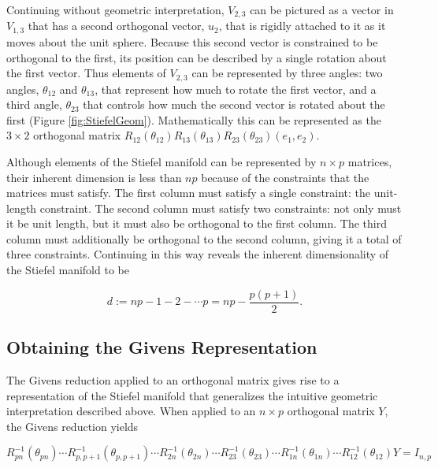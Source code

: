 \documentclass[ba]{imsart}
\numberwithin{equation}{section}
\theoremstyle{plain}
\begin{document}
\noindent Continuing without geometric interpretation, $V_{2,3}$ can be pictured as a vector in $V_{1,3}$ that has a second orthogonal vector, $u_2$, that is rigidly attached to it as it moves about the unit sphere. Because this second vector is constrained to be orthogonal to the first, its position can be described by a single rotation about the first vector. Thus elements of $V_{2,3}$ can be represented by three angles: two angles, $\theta_{12}$ and $\theta_{13}$, that represent how much to rotate the first vector, and a third angle, $\theta_{23}$ that controls how much the second vector is rotated about the first (Figure \ref{fig:StiefelGeom}). Mathematically this can be represented as the $3 \times 2$ orthogonal matrix $R_{12}(\theta_{12}) R_{13}(\theta_{13}) R_{23}(\theta_{23}) (e_1, e_2)$.

\noindent Although elements of the Stiefel manifold can be represented by $n \times p$ matrices, their inherent dimension is less than $np$ because of the constraints that the matrices must satisfy. The first column must satisfy a single constraint: the unit-length constraint. The second column must satisfy two constraints: not only must it be unit length, but it must also be orthogonal to the first column. The third column must additionally be orthogonal to the second column, giving it a total of three constraints. Continuing in this way reveals the inherent dimensionality of the Stiefel manifold to be

\begin{equation}
\label{eq:stiefel_dimension}
d := np - 1 - 2- \cdots p  = np - \frac{p(p+1)}{2}.
\end{equation}

\subsection{Obtaining the Givens Representation}\label{givens_representation_introduction}
The Givens reduction applied to an orthogonal matrix gives rise to a representation of the Stiefel manifold that generalizes the intuitive geometric interpretation described above. When applied to an $n \times p$ orthogonal matrix $Y$, the Givens reduction yields 

\begin{equation}
\label{eq:inverse_givens_representation}
R_{pn}^{-1}(\theta_{pn}) \cdots R_{p,p+1}^{-1}(\theta_{p,p+1})  \cdots R_{2n}^{-1}(\theta_{2n}) \cdots R_{23}^{-1}(\theta_{23}) \cdots R_{1n}^{-1}(\theta_{1n}) \cdots R_{12}^{-1}(\theta_{12}) Y = I_{n,p}
\end{equation}
\end{document}
